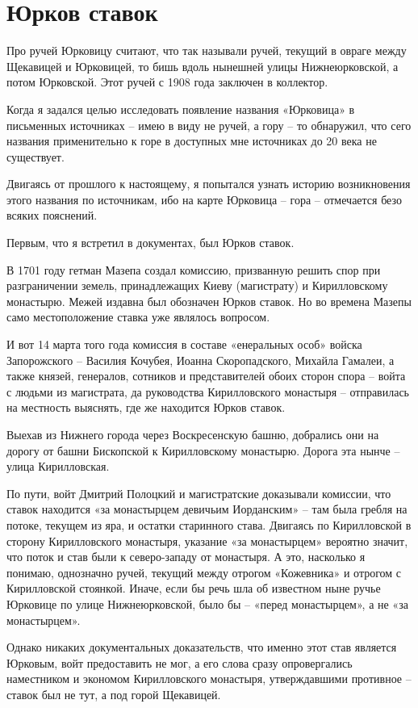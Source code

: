\chapter{Юрков ставок}

Про ручей Юрковицу считают, что так называли ручей, текущий в овраге между Щекавицей и Юрковицей, то бишь вдоль нынешней улицы Нижнеюрковской, а потом Юрковской. Этот ручей с 1908 года заключен в коллектор.

Когда я задался целью исследовать появление названия «Юрковица» в письменных источниках – имею в виду не ручей, а гору – то обнаружил, что сего названия применительно к горе в доступных мне источниках до 20 века не существует.

Двигаясь от прошлого к настоящему, я попытался узнать историю возникновения этого названия по источникам, ибо на карте Юрковица – гора – отмечается безо всяких пояснений.

Первым, что я встретил в документах, был Юрков ставок.

В 1701 году гетман Мазепа создал комиссию, призванную решить спор при разграничении земель, принадлежащих Киеву (магистрату) и Кирилловскому монастырю. Межей издавна был обозначен Юрков ставок. Но во времена Мазепы само местоположение ставка уже являлось вопросом.

И вот 14 марта того года комиссия в составе «енеральных особ» войска Запорожского – Василия Кочубея, Иоанна Скоропадского, Михайла Гамалеи, а также князей, генералов, сотников и представителей обоих сторон спора – войта с людьми из магистрата, да руководства Кирилловского монастыря – отправилась на местность выяснять, где же находится Юрков ставок.

Выехав из Нижнего города через Воскресенскую башню, добрались они на дорогу от башни Бископской к Кирилловскому монастырю. Дорога эта нынче – улица Кирилловская.

По пути, войт Дмитрий Полоцкий и магистратские доказывали комиссии, что ставок находится «за монастырцем девичьим Иорданским» – там была гребля на потоке, текущем из яра, и остатки старинного става. Двигаясь по Кирилловской в сторону Кирилловского монастыря, указание «за монастырцем» вероятно значит, что поток и став были к северо-западу от монастыря. А это, насколько я понимаю, однозначно ручей, текущий между отрогом «Кожевника» и отрогом с Кирилловской стоянкой. Иначе, если бы речь шла об известном ныне ручье Юрковице по улице Нижнеюрковской, было бы – «перед монастырцем», а не «за монастырцем».

Однако никаких документальных доказательств, что именно этот став является Юрковым, войт предоставить не мог, а его слова сразу опровергались наместником и экономом Кирилловского монастыря, утверждавшими противное – ставок был не тут, а под горой Щекавицей.

